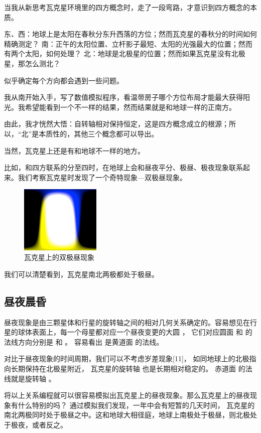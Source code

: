 \documentclass[a4paper,10.5pt]{article}
\begin{document}
当我从新思考瓦克星环境里的四方概念时，走了一段弯路，才意识到四方概念的本质。

东、西：地球上是太阳在春秋分东升西落的方位；然而瓦克星的春秋分的时间如何精确测定？
南：正午的太阳位置、立杆影子最短、太阳的光强最大的位置；然而有两个太阳，如何处理？
北：地球是北极星的位置；然而如果瓦克星没有北极星，那怎么测北？

似乎确定每个方向都会遇到一些问题。

我从南开始入手，写了数值模拟程序，看温带房子哪个方位布局才能最大获得阳光。我希望能看到一个不一样的结果，然而结果就是和地球一样的正南方。

由此，我才恍然大悟：自转轴相对保持恒定，这是四方概念成立的根源；所以，“北”是本质性的，其他三个概念都可以导出。

当然，瓦克星上还是有和地球不一样的地方。

比如，和四方联系的分至四时，在地球上会和昼夜平分、极昼、极夜现象联系起来。我们考察瓦克星时发现了一个奇特现象—双极昼现象。

\begin{figure}[ht]
\centering
\includegraphics[width=1.5in]{images/4_02-day-night.png}
\caption{瓦克星上的双极昼现象}
\end{figure}

我们可以清楚看到，瓦克星南北两极都处于极昼。

\subsection{昼夜晨昏}

昼夜现象是由三颗星体和行星的旋转轴之间的相对几何关系确定的。容易想见在行星的球体表面上，每一个母星都对应一个昼夜变更的大圆 ，
它们对应圆面   和   的法线方向分别是    和   。 容易看出   是黄道面   的法线。

对比于昼夜现象的时间周期，我们可以不考虑岁差现象[11]， 如同地球上的北极指向长期保持在北极星附近， 瓦克星的旋转轴  也是长期相对稳定的。
赤道面   的法线就是旋转轴  。

将以上关系编程就可以很容易模拟出瓦克星上的昼夜现象。那么瓦克星上的昼夜现象有什么特别的吗？ 通过模拟我们发现，一年中会有短暂的几天时间，
瓦克星的南北两极同时处于极昼之中。这和地球大相径庭，地球上南极处于极昼，则北极处于极夜，或者反之。
\end{document}
